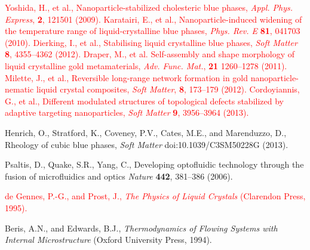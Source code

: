 \documentclass[12pt]{article}
\begin{document}
\begin{thebibliography}{99}
\textcolor{red}{
Yoshida, H., et al.,
Nanoparticle-stabilized cholesteric blue phases,
\textit{Appl. Phys. Express}, \textbf{2}, 121501 (2009).
%
 Karatairi, E., et al.,
Nanoparticle-induced widening of the temperature range of
liquid-crystalline blue phases, 
\textit{Phys. Rev. E} \textbf{81}, 041703 (2010).
%
%
Dierking, I., et al.,
Stabilising liquid crystalline blue phases,
\textit{Soft Matter} \textbf{8}, 4355--4362 (2012).
%
Draper, M., et al.
Self-assembly and shape morphology of liquid crystalline gold metamaterials,
\textit{Adv. Func. Mat.}, \textbf{21} 1260--1278 (2011).
%
Milette, J., et al.,
Reversible long-range network formation in gold nanoparticle-nematic
liquid crystal composites,
\textit{Soft Matter}, \textbf{8}, 173--179 (2012).
%
 Cordoyiannis, G., et al.,
Different modulated structures of topological defects stabilized by adaptive
targeting nanoparticles,
\textit{Soft Matter} \textbf{9}, 3956--3964 (2013).
}

Henrich, O., Stratford, K., Coveney, P.V., Cates, M.E., and Marenduzzo, D.,
Rheology of cubic blue phases,
{\it Soft Matter} doi:10.1039/C3SM50228G (2013).

 Psaltis, D., Quake, S.R., Yang, C.,
Developing optofluidic technology through the fusion of microfluidics and
optics {\it Nature} {\bf 442}, 381--386 (2006).


\textcolor{red}{de Gennes, P.-G., and  Prost, J.,
{\it The Physics of Liquid Crystals} (Clarendon Press, 1995).}

Beris, A.N., and  Edwards, B.J., 
{\it Thermodynamics of Flowing Systems with Internal Microstructure}
(Oxford University Press, 1994).


\end{thebibliography}
\end{document}
